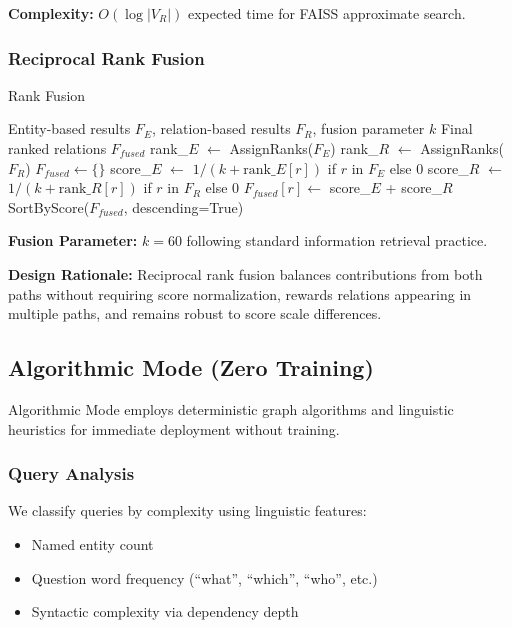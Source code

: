 \documentclass[11pt,a4paper]{article}
\begin{document}
\textbf{Complexity:} $O(\log |V_R|)$ expected time for FAISS approximate search.

\subsubsection{Reciprocal Rank Fusion}

\begin{algorithm}
\caption{Rank Fusion}
\begin{algorithmic}[1]
\require Entity-based results $F_E$, relation-based results $F_R$, fusion parameter $k$
\ENSURE Final ranked relations $F_{fused}$
\STATE rank\_$E$ $\leftarrow$ AssignRanks($F_E$) 
\STATE rank\_$R$ $\leftarrow$ AssignRanks($F_R$)
\STATE $F_{fused} \leftarrow \{\}$
    \STATE score\_$E$ $\leftarrow$ $1/(k + \text{rank}\_E[r])$ if $r$ in $F_E$ else 0
    \STATE score\_$R$ $\leftarrow$ $1/(k + \text{rank}\_R[r])$ if $r$ in $F_R$ else 0
    \STATE $F_{fused}[r] \leftarrow$ score\_$E$ + score\_$R$
\ENDFOR
\RETURN SortByScore($F_{fused}$, descending=True)
\end{algorithmic}
\end{algorithm}

\textbf{Fusion Parameter:} $k=60$ following standard information retrieval practice.

\textbf{Design Rationale:} Reciprocal rank fusion balances contributions from both paths without requiring score normalization, rewards relations appearing in multiple paths, and remains robust to score scale differences.

\subsection{Algorithmic Mode (Zero Training)}

Algorithmic Mode employs deterministic graph algorithms and linguistic heuristics for immediate deployment without training.

\subsubsection{Query Analysis}

We classify queries by complexity using linguistic features:

\begin{itemize}
    \item Named entity count
    \item Question word frequency (``what'', ``which'', ``who'', etc.)
    \item Syntactic complexity via dependency depth
\end{itemize}
\end{document}
